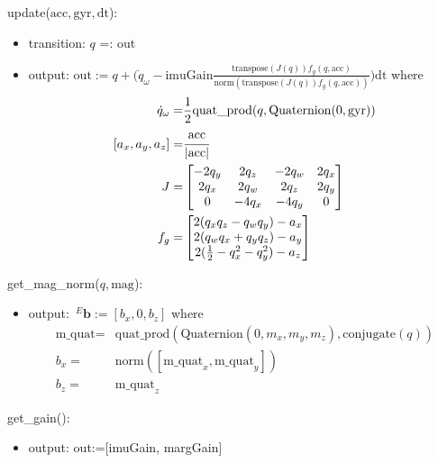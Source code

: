 \documentclass[12pt, titlepage]{article}
\begin{document}
\noindent update($\text{acc}, \text{gyr}, \text{dt}$):
\begin{itemize}
\item transition: $q$ =: out
\item output: $\text{out} := q + \Big( \dot{q}_{\omega} -
\text{imuGain}\frac{\text{transpose}(J(q))f_g( q,
\text{acc})}{\text{norm}(\text{transpose}(J(q))f_g( q, \text{acc}))}\Big) \text{dt}$ where
\begin{align*}
  \dot{q}_{\omega} =& \frac{1}{2} \text{quat\_prod}(q, \text{Quaternion}(0, \text{gyr})) \\
  [a_x, a_y, a_z] =& \cfrac{\text{acc}}{|\text{acc}|} \\
  J =& \begin{bmatrix}
    -2q_y & 2q_z & -2q_w & 2q_x \\
    2q_x & 2q_w & 2q_z & 2q_y \\
    0 & -4q_x & -4q_y & 0
    \end{bmatrix}\\
  f_{g} =& \begin{bmatrix}
    2(q_xq_z-q_wq_y)-a_x \\ 2(q_wq_x+q_yq_z)-a_y \\ 2(\frac{1}{2}-q_x^2-q_y^2)-a_z
  \end{bmatrix}
\end{align*}
\end{itemize}

\noindent get\_mag\_norm($q, \text{mag}$):\
\begin{itemize}
  \item output: $\,^E\mathbf{b}:= [b_x, 0, b_z]$ where
\begin{align*} \text{m\_quat} =& \text{quat\_prod}(\text{Quaternion}(0, m_x, m_y, m_z),
\text{conjugate}(q)) \\
  b_x =& \text{norm}([\text{m\_quat}_x, \text{m\_quat}_y]) \\
  b_z =& \text{m\_quat}_z
\end{align*}
\end{itemize}

\noindent get\_gain():
\begin{itemize}
\item output: out:=[imuGain, margGain]
\end{itemize}
\end{document}
